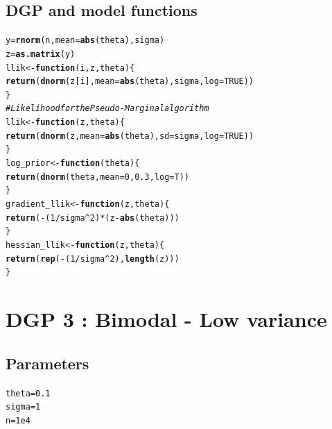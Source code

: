 \documentclass[11pt,a4paper]{report}\usepackage[]{graphicx}\usepackage[]{color}
\makeatletter
\newcommand{\hlnum}[1]{\textcolor[rgb]{0.686,0.059,0.569}{#1}}%
\newcommand{\hlcom}[1]{\textcolor[rgb]{0.678,0.584,0.686}{\textit{#1}}}%
\newcommand{\hlopt}[1]{\textcolor[rgb]{0,0,0}{#1}}%
\newcommand{\hlstd}[1]{\textcolor[rgb]{0.345,0.345,0.345}{#1}}%
\newcommand{\hlkwa}[1]{\textcolor[rgb]{0.161,0.373,0.58}{\textbf{#1}}}%
\newcommand{\hlkwb}[1]{\textcolor[rgb]{0.69,0.353,0.396}{#1}}%
\newcommand{\hlkwc}[1]{\textcolor[rgb]{0.333,0.667,0.333}{#1}}%
\newcommand{\hlkwd}[1]{\textcolor[rgb]{0.737,0.353,0.396}{\textbf{#1}}}%
\newenvironment{kframe}{%
 \def\at@end@of@kframe{}%
 \ifinner\ifhmode%
  \def\at@end@of@kframe{\end{minipage}}%
  \begin{minipage}{\columnwidth}%
 \fi\fi%
 \def\FrameCommand##1{\hskip\@totalleftmargin \hskip-\fboxsep
 \colorbox{shadecolor}{##1}\hskip-\fboxsep
     \hskip-\linewidth \hskip-\@totalleftmargin \hskip\columnwidth}%
 \MakeFramed {\advance\hsize-\width
   \@totalleftmargin\z@ \linewidth\hsize
   \@setminipage}}%
 {\par\unskip\endMakeFramed%
 \at@end@of@kframe}
\newenvironment{knitrout}{}{} %
\makeatother
\begin{document}
\begin{appendix}
\subsection{DGP and model functions}
\begin{knitrout}
\color{fgcolor}\begin{kframe}
\begin{alltt}
\hlstd{y}\hlkwb{=}\hlkwd{rnorm}\hlstd{(n,}\hlkwc{mean}\hlstd{=}\hlkwd{abs}\hlstd{(theta),sigma)}
\hlstd{z}\hlkwb{=}\hlkwd{as.matrix}\hlstd{(y)}
\hlstd{llik}\hlkwb{<-}\hlkwa{function} \hlstd{(}\hlkwc{i}\hlstd{,}\hlkwc{z}\hlstd{,}\hlkwc{theta}\hlstd{) \{}
  \hlkwd{return}\hlstd{(}\hlkwd{dnorm}\hlstd{(z[i],}\hlkwc{mean}\hlstd{=}\hlkwd{abs}\hlstd{(theta),sigma,} \hlkwc{log}\hlstd{=}\hlnum{TRUE}\hlstd{))}
\hlstd{\}}
\hlcom{#Likelihood for the Pseudo-Marginal algorithm}
\hlstd{llik}\hlkwb{<-}\hlkwa{function} \hlstd{(}\hlkwc{z}\hlstd{,}\hlkwc{theta}\hlstd{) \{}
  \hlkwd{return}\hlstd{(}\hlkwd{dnorm}\hlstd{(z,}\hlkwc{mean}\hlstd{=}\hlkwd{abs}\hlstd{(theta),} \hlkwc{sd}\hlstd{=sigma,} \hlkwc{log}\hlstd{=}\hlnum{TRUE}\hlstd{))}
\hlstd{\}}
\hlstd{log_prior}\hlkwb{<-}\hlkwa{function}\hlstd{(}\hlkwc{theta}\hlstd{) \{}
  \hlkwd{return}\hlstd{(}\hlkwd{dnorm}\hlstd{(theta,}\hlkwc{mean}\hlstd{=}\hlnum{0}\hlstd{,}\hlnum{0.3}\hlstd{,}\hlkwc{log}\hlstd{=T))}
\hlstd{\}}
\hlstd{gradient_llik}\hlkwb{<-}\hlkwa{function}\hlstd{(}\hlkwc{z}\hlstd{,}\hlkwc{theta}\hlstd{) \{}
  \hlkwd{return}\hlstd{(}\hlopt{-}\hlstd{(}\hlnum{1}\hlopt{/}\hlstd{sigma}\hlopt{^}\hlnum{2}\hlstd{)}\hlopt{*}\hlstd{(z}\hlopt{-}\hlkwd{abs}\hlstd{(theta)))}
\hlstd{\}}
\hlstd{hessian_llik}\hlkwb{<-}\hlkwa{function}\hlstd{(}\hlkwc{z}\hlstd{,}\hlkwc{theta}\hlstd{) \{}
  \hlkwd{return}\hlstd{(}\hlkwd{rep}\hlstd{(}\hlopt{-}\hlstd{(}\hlnum{1}\hlopt{/}\hlstd{sigma}\hlopt{^}\hlnum{2}\hlstd{),}\hlkwd{length}\hlstd{(z)))}
\hlstd{\}}
\end{alltt}
\end{kframe}
\end{knitrout}

\section{DGP 3 : Bimodal - Low variance}
\subsection{Parameters}
\begin{knitrout}
\color{fgcolor}\begin{kframe}
\begin{alltt}
\hlstd{theta}\hlkwb{=}\hlnum{0.1}
\hlstd{sigma}\hlkwb{=}\hlnum{1}
\hlstd{n}\hlkwb{=}\hlnum{1e4}
\end{alltt}
\end{kframe}
\end{knitrout}

\end{appendix}
\end{document}

